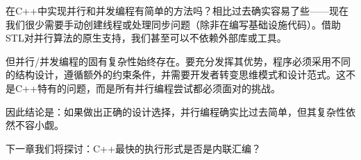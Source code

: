 在C++中实现并行和并发编程有简单的方法吗？相比过去确实容易了些——现在我们很少需要手动创建线程或处理同步问题（除非在编写基础设施代码）。借助STL对并行算法的原生支持，我们甚至可以不依赖外部库或工具。

但并行/并发编程的固有复杂性始终存在。要充分发挥其优势，程序必须采用不同的结构设计，遵循额外的约束条件，并需要开发者转变思维模式和设计范式。这不是C++特有的问题，而是所有并行编程尝试都必须面对的挑战。

因此结论是：如果做出正确的设计选择，并行编程确实比过去简单，但其复杂性依然不容小觑。

下一章我们将探讨：C++最快的执行形式是否是内联汇编？